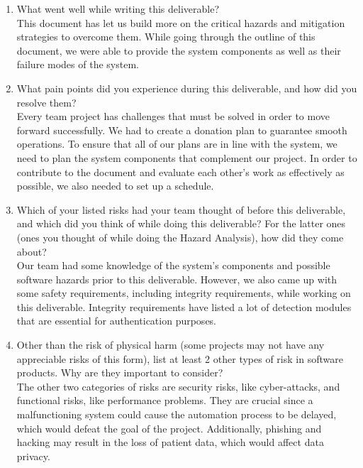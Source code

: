\documentclass{article}
\begin{document}



\begin{enumerate}
    \item What went well while writing this deliverable?\\
    This document has let us build more on the critical hazards and mitigation strategies to overcome them. While going through the outline of this document, we were able to provide the system components as well as their failure modes of the system. 
    
    \item What pain points did you experience during this deliverable, and how did you resolve them?\\
    Every team project has challenges that must be solved in order to move forward successfully. We had to create a donation plan to guarantee smooth operations. To ensure that all of our plans are in line with the system, we need to plan the system components that complement our project. In order to contribute to the document and evaluate each other's work as effectively as possible, we also needed to set up a schedule.

    \item Which of your listed risks had your team thought of before this deliverable, and which did you think of while doing this deliverable? For the latter ones (ones you thought of while doing the Hazard Analysis), how did they come about?\\
    Our team had some knowledge of the system's components and possible software hazards prior to this deliverable. However, we also came up with some safety requirements, including integrity requirements, while working on this deliverable. Integrity requirements have listed a lot of detection modules that are essential for authentication purposes.
    
    \item Other than the risk of physical harm (some projects may not have any appreciable risks of this form), list at least 2 other types of risk in software products. Why are they important to consider?\\
    The other two categories of risks are security risks, like cyber-attacks, and functional risks, like performance problems. They are crucial since a malfunctioning system could cause the automation process to be delayed, which would defeat the goal of the project. Additionally, phishing and hacking may result in the loss of patient data, which would affect data privacy. 

\end{enumerate}
\end{document}

